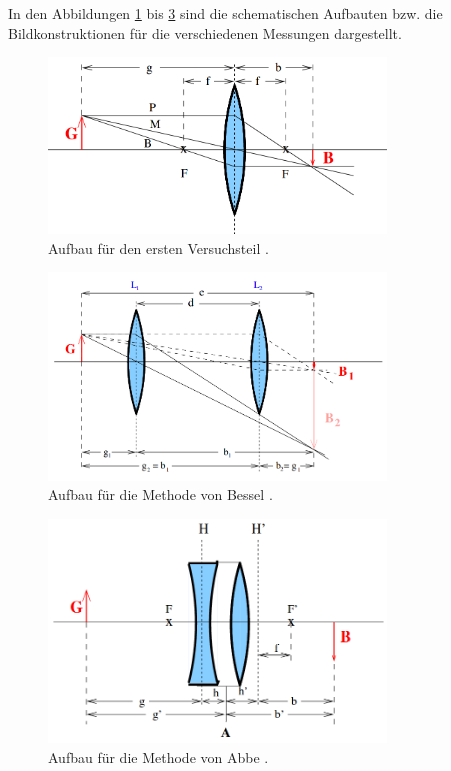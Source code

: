 \documentclass[
  bibliography=totoc,     %
  captions=tableheading,  %
  titlepage=firstiscover, %
]{scrartcl}
\begin{document}
\noindent
In den Abbildungen \ref{fig:V4081} bis \ref{fig:V4083} sind die schematischen
Aufbauten bzw. die Bildkonstruktionen für die verschiedenen Messungen dargestellt.
\begin{figure}[htb]
  \centering
  \includegraphics[width=0.8\textwidth]{V4081.png}
  \caption{Aufbau für den ersten Versuchsteil \cite{anleitung}.}
  \label{fig:V4081}
\end{figure}
\begin{figure}[htb]
  \centering
  \includegraphics[width=0.8\textwidth]{V4082.png}
  \caption{Aufbau für die Methode von Bessel \cite{anleitung}.}
  \label{fig:V4082}
\end{figure}
\clearpage
\begin{figure}[htb]
  \centering
  \includegraphics[width=0.8\textwidth]{V4083.png}
  \caption{Aufbau für die Methode von Abbe \cite{anleitung}.}
  \label{fig:V4083}
\end{figure}
\end{document}
